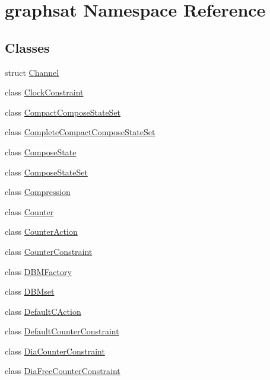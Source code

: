 \hypertarget{namespacegraphsat}{}\section{graphsat Namespace Reference}
\label{namespacegraphsat}
\subsection*{Classes}
\begin{DoxyCompactItemize}
\item 
struct \mbox{\hyperlink{structgraphsat_1_1_channel}{Channel}}
\item 
class \mbox{\hyperlink{classgraphsat_1_1_clock_constraint}{Clock\+Constraint}}
\item 
class \mbox{\hyperlink{classgraphsat_1_1_compact_compose_state_set}{Compact\+Compose\+State\+Set}}
\item 
class \mbox{\hyperlink{classgraphsat_1_1_complete_compact_compose_state_set}{Complete\+Compact\+Compose\+State\+Set}}
\item 
class \mbox{\hyperlink{classgraphsat_1_1_compose_state}{Compose\+State}}
\item 
class \mbox{\hyperlink{classgraphsat_1_1_compose_state_set}{Compose\+State\+Set}}
\item 
class \mbox{\hyperlink{classgraphsat_1_1_compression}{Compression}}
\item 
class \mbox{\hyperlink{classgraphsat_1_1_counter}{Counter}}
\item 
class \mbox{\hyperlink{classgraphsat_1_1_counter_action}{Counter\+Action}}
\item 
class \mbox{\hyperlink{classgraphsat_1_1_counter_constraint}{Counter\+Constraint}}
\item 
class \mbox{\hyperlink{classgraphsat_1_1_d_b_m_factory}{D\+B\+M\+Factory}}
\item 
class \mbox{\hyperlink{classgraphsat_1_1_d_b_mset}{D\+B\+Mset}}
\item 
class \mbox{\hyperlink{classgraphsat_1_1_default_c_action}{Default\+C\+Action}}
\item 
class \mbox{\hyperlink{classgraphsat_1_1_default_counter_constraint}{Default\+Counter\+Constraint}}
\item 
class \mbox{\hyperlink{classgraphsat_1_1_dia_counter_constraint}{Dia\+Counter\+Constraint}}
\item 
class \mbox{\hyperlink{classgraphsat_1_1_dia_free_counter_constraint}{Dia\+Free\+Counter\+Constraint}}
\item 

\end{DoxyCompactItemize}
